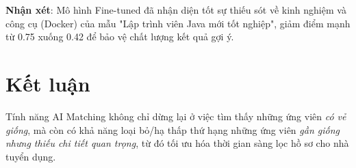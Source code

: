 \documentclass[12pt, a4paper]{article}
\begin{document}
\textbf{Nhận xét}: Mô hình Fine-tuned đã nhận diện tốt sự thiếu sót về kinh nghiệm và công cụ (Docker) của mẫu "Lập trình viên Java mới tốt nghiệp", giảm điểm mạnh từ 0.75 xuống 0.42 để bảo vệ chất lượng kết quả gợi ý.

\section{Kết luận}
Tính năng AI Matching không chỉ dừng lại ở việc tìm thấy những ứng viên \textit{có vẻ giống}, mà còn có khả năng loại bỏ/hạ thấp thứ hạng những ứng viên \textit{gần giống nhưng thiếu chi tiết quan trọng}, từ đó tối ưu hóa thời gian sàng lọc hồ sơ cho nhà tuyển dụng.
\end{document}
